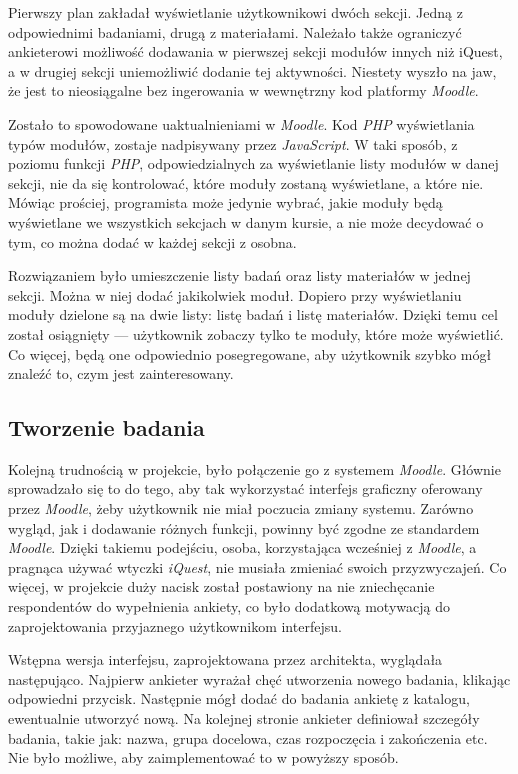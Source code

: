 \documentclass[12pt]{article}
\begin{document}
Pierwszy plan zakładał wyświetlanie użytkownikowi dwóch sekcji. Jedną z odpowiednimi badaniami, drugą z materiałami. Należało także ograniczyć ankieterowi możliwość dodawania w pierwszej sekcji modułów innych niż iQuest, a w drugiej sekcji uniemożliwić dodanie tej aktywności. Niestety wyszło na jaw, że jest to nieosiągalne bez ingerowania w wewnętrzny kod platformy \emph{Moodle}. 

Zostało to spowodowane uaktualnieniami w \emph{Moodle}. Kod \emph{PHP} wyświetlania typów modułów, zostaje nadpisywany przez \emph{JavaScript}. W taki sposób, z poziomu funkcji \emph{PHP}, odpowiedzialnych za wyświetlanie listy modułów w danej sekcji, nie da się kontrolować, które moduły zostaną wyświetlane, a które nie. Mówiąc prościej, programista może jedynie wybrać, jakie moduły będą wyświetlane we wszystkich sekcjach w danym kursie, a nie może decydować o tym, co można dodać w każdej sekcji z osobna.

Rozwiązaniem było umieszczenie listy badań oraz listy materiałów w jednej sekcji. Można w niej dodać jakikolwiek moduł. Dopiero przy wyświetlaniu moduły dzielone są na dwie listy: listę badań i listę materiałów. Dzięki temu cel został osiągnięty --- użytkownik zobaczy tylko te moduły, które może wyświetlić. Co więcej, będą one odpowiednio posegregowane, aby użytkownik szybko mógł znaleźć to, czym jest zainteresowany.

\subsection{Tworzenie badania}
Kolejną trudnością w projekcie, było połączenie go z systemem \emph{Moodle}. Głównie sprowadzało się to do tego, aby tak wykorzystać interfejs graficzny oferowany przez \emph{Moodle}, żeby użytkownik nie miał poczucia zmiany systemu. Zarówno wygląd, jak i dodawanie różnych funkcji, powinny być zgodne ze standardem \emph{Moodle}. Dzięki takiemu podejściu, osoba, korzystająca wcześniej z \emph{Moodle}, a pragnąca używać wtyczki \emph{iQuest}, nie musiała zmieniać swoich przyzwyczajeń. Co więcej, w projekcie duży nacisk został postawiony na nie zniechęcanie respondentów do wypełnienia ankiety, co było dodatkową motywacją do zaprojektowania przyjaznego użytkownikom interfejsu.

Wstępna wersja interfejsu, zaprojektowana przez architekta, wyglądała następująco. Najpierw ankieter wyrażał chęć utworzenia nowego badania, klikając odpowiedni przycisk. Następnie mógł dodać do badania ankietę z katalogu, ewentualnie utworzyć nową. Na kolejnej stronie ankieter definiował szczegóły badania, takie jak: nazwa, grupa docelowa, czas rozpoczęcia i zakończenia etc. Nie było możliwe, aby zaimplementować to w powyższy sposób.
\end{document}
